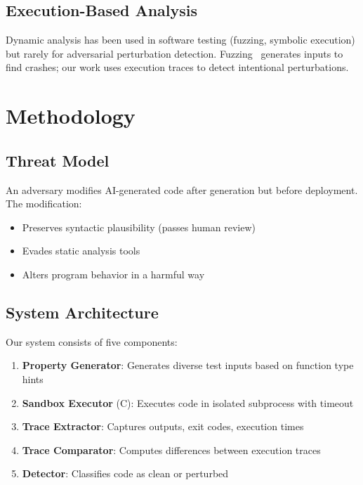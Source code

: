 \documentclass[conference]{IEEEtran}
\begin{document}
\subsection{Execution-Based Analysis}

Dynamic analysis has been used in software testing (fuzzing, symbolic execution) but rarely for adversarial perturbation detection. Fuzzing~\cite{chen2021evaluating} generates inputs to find crashes; our work uses execution traces to detect intentional perturbations.

\section{Methodology}
\label{sec:method}

\subsection{Threat Model}
\label{sec:threat}

An adversary modifies AI-generated code after generation but before deployment. The modification:
\begin{itemize}
    \item Preserves syntactic plausibility (passes human review)
    \item Evades static analysis tools
    \item Alters program behavior in a harmful way
\end{itemize}

\subsection{System Architecture}
\label{sec:architecture}

Our system consists of five components:

\begin{enumerate}
    \item \textbf{Property Generator}: Generates diverse test inputs based on function type hints
    \item \textbf{Sandbox Executor} (C): Executes code in isolated subprocess with timeout
    \item \textbf{Trace Extractor}: Captures outputs, exit codes, execution times
    \item \textbf{Trace Comparator}: Computes differences between execution traces
    \item \textbf{Detector}: Classifies code as clean or perturbed
\end{enumerate}
\end{document}
